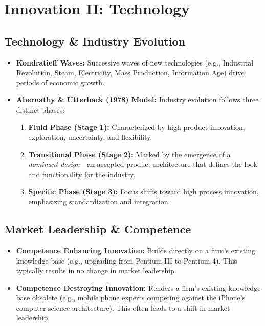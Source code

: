 \section{Innovation II: Technology}

\subsection*{Technology \& Industry Evolution}
\begin{itemize}
    \item \textbf{Kondratieff Waves:} Successive waves of new technologies (e.g., Industrial
          Revolution, Steam, Electricity, Mass Production, Information Age) drive periods
          of economic growth.
    \item \textbf{Abernathy \& Utterback (1978) Model:} Industry evolution follows three distinct
          phases:
          \begin{enumerate}
              \item \textbf{Fluid Phase (Stage 1):} Characterized by high product innovation, exploration,
                    uncertainty, and flexibility.
              \item \textbf{Transitional Phase (Stage 2):} Marked by the emergence of a \textit{dominant design}—an accepted product architecture that defines the look and
                    functionality for the industry.
              \item \textbf{Specific Phase (Stage 3):} Focus shifts toward high process innovation,
                    emphasizing standardization and integration.
          \end{enumerate}
\end{itemize}

\subsection*{Market Leadership \& Competence}
\begin{itemize}
    \item \textbf{Competence Enhancing Innovation:} Builds directly on a firm's existing
          knowledge base (e.g., upgrading from Pentium III to Pentium 4). This typically
          results in no change in market leadership.
    \item \textbf{Competence Destroying Innovation:} Renders a firm's existing knowledge base
          obsolete (e.g., mobile phone experts competing against the iPhone's computer
          science architecture). This often leads to a shift in market leadership.
\end{itemize}

